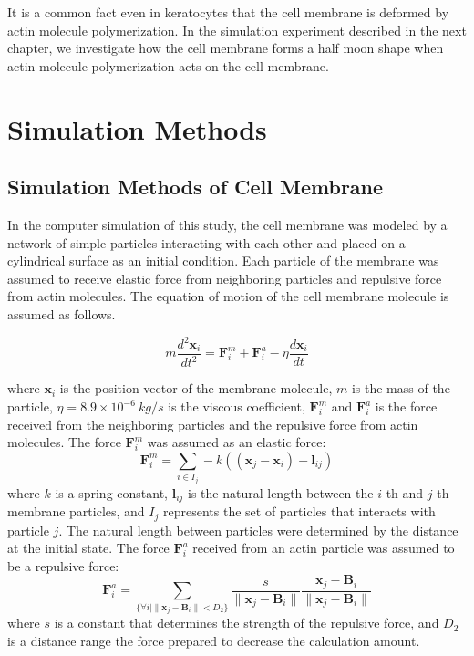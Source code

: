 \documentclass[a4paper,12pt, oneside]{book}
\begin{document}
It is a common fact even in keratocytes that the cell membrane is deformed by actin molecule polymerization. In the simulation experiment described in the next chapter, we investigate how the cell membrane forms a half moon shape when actin molecule polymerization acts on the cell membrane.

\chapter{Simulation Methods}
\section{Simulation Methods of Cell Membrane}
In the computer simulation of this study, the cell membrane was modeled by a network of simple particles interacting with each other and placed on a cylindrical surface as an initial condition.
Each particle of the membrane was assumed to receive elastic force from neighboring particles and repulsive force from actin molecules.
The equation of motion of the cell membrane molecule is assumed as follows.

\begin{equation}
m\frac{d^2\bm{x}_i}{dt^2} = \bm{F}^m_i +  \bm{F}^a_i - \eta \frac{d\bm{x}_i}{dt}
\end{equation}

where  $\bm{x}_i$ is the position vector of the membrane molecule, $m$ is the mass of the particle, $\eta=8.9\times10^{-6}\si{~kg/s}$ is the viscous coefficient, $\bm{F}^m_i$ and $\bm{F}^a_i$ is the force received from the neighboring particles and  the repulsive force from actin molecules.
The force  $\bm{F}^m_i$ was assumed as an elastic force:
\begin{equation}
\bm{F}^m_i = \sum_{i \in I_j}  -k((\bm{x}_j -\bm{x}_i )-\bm{l}_{ij} )
\end{equation}
where $k$ is a spring constant, $\bm{l}_{ij}$ is the natural length between the $i$-th and $j$-th membrane particles, and $I_j$ represents the set of particles that interacts with particle $j$.
The natural length between particles were determined by the distance  at the initial state.
The force $\bm{F}^a_i$ received from an actin particle was assumed to be a  repulsive force:
\begin{equation}
\bm{F}^a_i = \sum_{\{ \forall i | \| \bm{x}_j - \bm{B}_i \|<D_2\}} \frac{s}{\|\bm{x}_j -\bm{B}_i \|} \frac{\bm{x}_j -\bm{B}_i }{\|\bm{x}_j -\bm{B}_i \|}
\end{equation}
where $s$ is a constant that determines the strength of the repulsive force, and $D_2$ is a distance range  the  force prepared to decrease the calculation amount.
\end{document}
